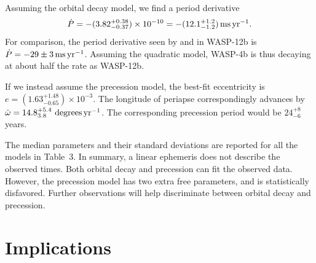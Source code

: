 \documentclass[12pt,twocolumn,tighten]{aastex62}
\begin{document}
Assuming the orbital decay model, we find a period derivative 
\begin{equation}
\dot{P}
    = - (3.82^{+0.38}_{-0.37})\times 10^{-10}
    = - (12.1^{+1.2}_{-1.2})\,{\rm ms}\,{\rm yr}^{-1}.
\end{equation}
For comparison, the period derivative seen by
\citet{maciejewski_departure_2016} and \citet{patra_2017} in
WASP-12b is $\dot{P} = -29 \pm 3\,{\rm ms}\,{\rm yr}^{-1}$.
Assuming the quadratic model, WASP-4b is thus decaying at
about half the rate as WASP-12b.

If we instead assume the precession model, the best-fit
eccentricity is $e = (1.63^{+ 1.48}_{- 0.65})\times10^{-3}$. The
longitude of periapse correspondingly advances by $\dot{\omega}
= 14.8^{+5.4}_{3.8}\ {\rm degrees}\,{\rm yr}^{-1}$.   The
corresponding precession period would be $24^{+8}_{-6}$ years.

The median parameters and their standard deviations are reported for
all the models in Table~3.  In summary, a linear ephemeris does not
describe the observed times.  Both orbital decay and precession can
fit the observed data.  However, the precession model has two extra
free parameters, and is statistically disfavored.  Further
observations will help discriminate between orbital decay and
precession.

\section{Implications}
\label{sec:implications}
\end{document}
